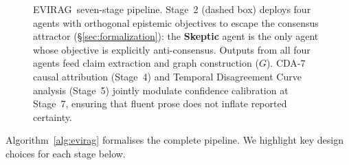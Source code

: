 \documentclass[11pt]{article}
\newcommand{\system}{\textsc{EVIRAG}\xspace}
\begin{document}
\begin{figure}[t]
{}%
\caption{\system\ seven-stage pipeline.  Stage~2 (dashed box) deploys four
agents with orthogonal epistemic objectives to escape the consensus attractor
(\S\ref{sec:formalization}): the \textbf{Skeptic} agent is the only agent
whose objective is explicitly anti-consensus.  Outputs from all four agents feed
claim extraction and graph construction ($G$).  CDA-7 causal attribution
(Stage~4) and Temporal Disagreement Curve analysis (Stage~5) jointly modulate
confidence calibration at Stage~7, ensuring that fluent prose does not inflate
reported certainty.}
\label{fig:architecture}
\end{figure}

Algorithm~\ref{alg:evirag} formalises the complete pipeline.  We highlight
key design choices for each stage below.
\end{document}

